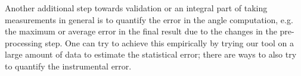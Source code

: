 Another additional step towards validation or an integral part of taking measurements in general %
is to quantify the error in the angle computation, e.g. the maximum or average error in the final result due to the changes in the pre-processing step. %
One can try to achieve this empirically by trying our tool on a large amount of data to estimate the statistical error; there are ways to also try to quantify the instrumental error. 


%


